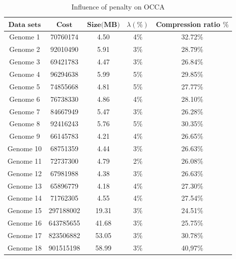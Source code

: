 \documentclass[preprint,12pt]{elsarticle}
\begin{document}
\begin{table}[tpbh]
\small

\caption{Influence of penalty on OCCA}
\centering
\begin{tabular}{c c c c c }
\toprule
$\textbf{Data sets}$ & $\textbf{Cost}$	& $\textbf{Size(MB)}$ &		\textbf{$\lambda (\%)$} &		\textbf{Compression ratio $\%$} \\\hline
Genome 1 &	 70760174 &4.50& 4\% & 32.72\%\\\hline
Genome 2 &	92010490& 5.91 & 3\%& 28.79\%\\\hline
Genome 3&	69421783& 4.47 &3\%& 26.84\%\\\hline
Genome 4&	96294638& 5.99 & 5\%& 29.85\%\\\hline
Genome 5&	74855668 &4.81& 5\%& 27.77\%\\\hline
Genome 6&	76738330& 4.86  &4\%& 28.10\%\\\hline
Genome 7&	84667949 &5.47& 3\%& 26.28\%\\\hline
Genome 8&	92416243 &5.76& 5\%& 30.35\%\\\hline
Genome 9&	66145783&4.21 & 4\%& 26.65\%\\\hline
Genome 10&	68751359& 4.44 &3\%& 26.63\%\\\hline
Genome 11&	72737300 &4.79& 2\%&26.08\%\\\hline
Genome 12&	67981988 & 4.38&3\%& 26.63\%\\\hline
Genome 13&	65896779& 4.18 &4\%& 27.30\%\\\hline
Genome 14&	71762305 &4.55 &4\%&27.54\% \\\hline
Genome 15&297188002 &19.31 & 3\%& 24.51\%\\\hline
Genome 16&643785655 & 41.68 & 3\%& 25.75\% \\\hline
Genome 17&823506882 & 53.05 & 3\%& 30.78\%\\\hline
Genome 18&901515198 &58.99 & 3\%& 40,97\%\\\hline
\bottomrule
\end{tabular}
\label{table5}
\end{table}
\end{document}
